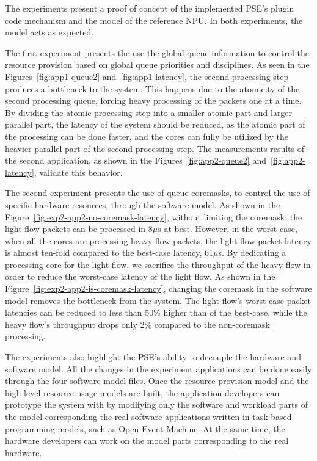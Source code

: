 
The experiments present a proof of concept of the implemented PSE's plugin code mechanism and the model of the reference NPU. In both experiments, the model acts as expected.

The first experiment presents the use the global queue information to control the resource provision based on global queue priorities and disciplines. As seen in the Figures~\ref{fig:app1-queue2} and~\ref{fig:app1-latency}, the second processing step produces a bottleneck to the system. This happens due to the atomicity of the second processing queue, forcing heavy processing of the packets one at a time. By dividing the atomic processing step into a smaller atomic part and larger parallel part, the latency of the system should be reduced, as the atomic part of the processing can be done faster, and the cores can fully be utilized by the heavier parallel part of the second processing step. The measurements results of the second application, as shown in the Figures~\ref{fig:app2-queue2} and~\ref{fig:app2-latency}, validate this behavior.

The second experiment presents the use of queue coremasks, to control the use of specific hardware resources, through the software model. As shown in the Figure~\ref{fig:exp2-app2-no-coremask-latency}, without limiting the coremask, the light flow packets can be processed in 8$\mu$s at best. However, in the worst-case, when all the cores are processing heavy flow packets, the light flow packet latency is almost ten-fold compared to the best-case latency, 61$\mu$s. By dedicating a processing core for the light flow, we sacrifice the throughput of the heavy flow in order to reduce the worst-case latency of the light flow. As shown in the Figure~\ref{fig:exp2-app2-is-coremask-latency}, changing the coremask in the software model removes the bottleneck from the system. The light flow's worst-case packet latencies can be reduced to less than 50\% higher than of the best-case, while the heavy flow's throughput drops only 2\% compared to the non-coremask processing.

The experiments also highlight the PSE's ability to decouple the hardware and software model. All the changes in the experiment applications can be done easily through the four software model files. Once the resource provision model and the high level resource usage models are built, the application developers can prototype the system with by modifying only the software and workload parts of the model corresponding the real software applications written in task-based programming models, such as Open Event-Machine. At the same time, the hardware developers can work on the model parts corresponding to the real hardware.

